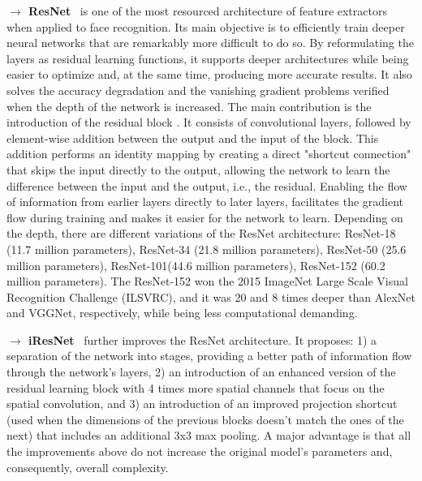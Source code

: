 \documentclass[class=report, crop=false, a4paper, 12pt]{standalone}
\begin{document}
\vspace{0.7\baselineskip}
\label{sec:resnet}
\noindent\textbf{$\rightarrow$ ResNet}~\autocite{heDeepResidualLearning2016} is one of the most resourced architecture of feature extractors when applied to face recognition. Its main objective is to efficiently train deeper neural networks that are remarkably more difficult to do so. By reformulating the layers as residual learning functions, it supports deeper architectures while being easier to optimize and, at the same time, producing more accurate results. It also solves the accuracy degradation and the vanishing gradient problems verified when the depth of the network is increased. The main contribution is the introduction of the residual block . It consists of convolutional layers, followed by element-wise addition between the output and the input of the block. This addition performs an identity mapping by creating a direct "shortcut connection" that skips the input directly to the output, allowing the network to learn the difference between the input and the output, i.e., the residual. Enabling the flow of information from earlier layers directly to later layers, facilitates the gradient flow during training and makes it easier for the network to learn. Depending on the depth, there are different variations of the ResNet architecture: ResNet-18 (11.7 million parameters), ResNet-34 (21.8 million parameters), ResNet-50 (25.6 million parameters), ResNet-101(44.6 million parameters), ResNet-152 (60.2 million parameters). The ResNet-152 won the 2015 ImageNet Large Scale Visual Recognition Challenge (ILSVRC), and it was 20 and 8 times deeper than AlexNet and VGGNet, respectively, while being less computational demanding.

\newpage
\noindent\textbf{$\rightarrow$ iResNet}~\autocite{dutaImprovedResidualNetworks2021} further improves the ResNet architecture. It proposes: 1) a separation of the network into stages, providing a better path of information flow through the network's layers, 2) an introduction of an enhanced version of the residual learning block with 4 times more spatial channels that focus on the spatial convolution, and 3) an introduction of an improved projection shortcut (used when the dimensions of the previous blocks doesn't match the ones of the next) that includes an additional 3x3 max pooling. A major advantage is that all the improvements above do not increase the original model's parameters and, consequently, overall complexity.
\end{document}
